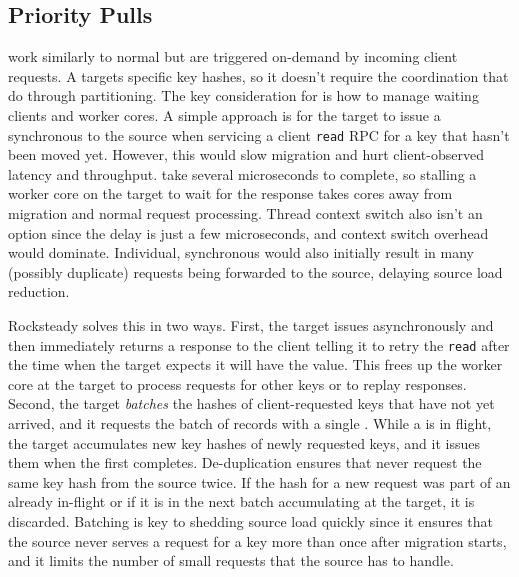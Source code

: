
\subsection{Priority Pulls}
\label{sec:priopulls}

\priopulls work similarly to normal \pulls but are triggered on-demand by
incoming client requests. A \priopull targets specific key hashes, so it
doesn't require the coordination that \pulls do through partitioning.
The key consideration for \priopulls is how to manage waiting clients and worker
cores.  A simple approach is for the target to issue a synchronous \priopull to
the source when servicing a client \texttt{read} RPC for a key that hasn't been
moved yet. However, this would slow migration and hurt client-observed latency
and throughput. \priopulls take several microseconds to complete, so stalling a
worker core on the target to wait for the response takes cores away from
migration and normal request processing. Thread context switch also isn't an
option since the delay is just a few microseconds, and context switch overhead
would dominate.  Individual, synchronous \priopulls would also initially result
in many (possibly duplicate) requests being forwarded to the source, delaying
source load reduction.

Rocksteady solves this in two ways. First, the target issues \priopulls
asynchronously and then immediately returns a response to the client telling it to
retry the \texttt{read} after the time when the target expects it will have the
value. This frees up the worker core at the target to process requests for
other keys or to replay \pull responses. Second, the target {\em batches} the
hashes of client-requested keys that have not yet arrived, and it
requests the batch of records with a single \priopull. While a
\priopull is in flight, the target accumulates new key hashes of newly
requested keys, and it issues them when the first \priopull completes.
De-duplication ensures that \priopulls never request the same key hash
from the source twice. If the hash for a new request was part of an already in-flight \priopull
or if it is in the next batch accumulating at the target, it is
discarded.  Batching is key to shedding source load quickly since it ensures
that the source never serves a request for a key more than once after migration
starts, and it limits the number of small requests that the source has to
handle.

